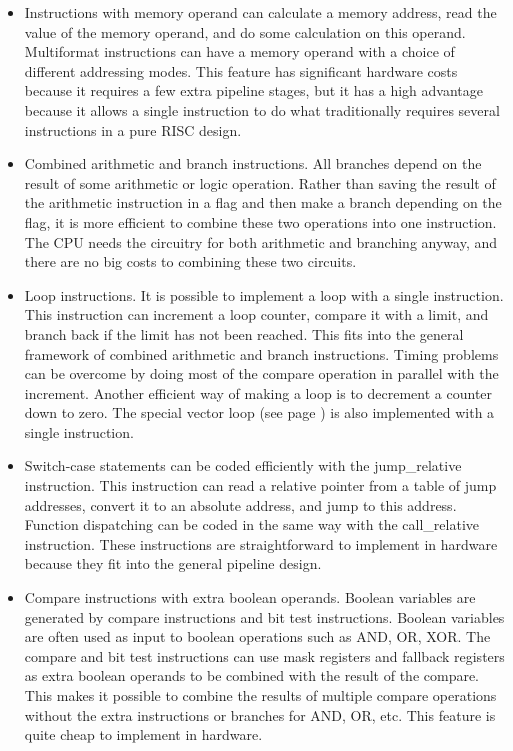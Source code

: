 \documentclass[forwardcom.tex]{subfiles}
\begin{document}
\begin{itemize}
\item Instructions with memory operand can calculate a memory address, read the value of the memory operand, and do some calculation on this operand. Multiformat instructions can have a memory operand with a choice of different addressing modes. This feature has significant hardware costs because it requires a few extra pipeline stages, but it has a high advantage because it allows a single instruction to do what traditionally requires several instructions in a pure RISC design.

\item Combined arithmetic and branch instructions. All branches depend on the result of some arithmetic or logic operation. Rather than saving the result of the arithmetic instruction in a flag and then make a branch depending on the flag, it is more efficient to combine these two operations into one instruction. The CPU needs the circuitry for both arithmetic and branching anyway, and there are no big costs to combining these two circuits.

\item Loop instructions. It is possible to implement a loop with a single instruction. This instruction can increment a loop counter, compare it with a limit, and branch back if the limit has not been reached. This fits into the general framework of combined arithmetic and branch instructions. Timing problems can be overcome by doing most of the compare operation in parallel with the increment. Another efficient way of making a loop is to decrement a counter down to zero. The special vector loop (see page \pageref{vectorLoops}) is also implemented with a single instruction.

\item Switch-case statements can be coded efficiently with the jump\_relative instruction. This instruction can read a relative pointer from a table of jump addresses, convert it to an absolute address, and jump to this address. Function dispatching can be coded in the same way with the call\_relative instruction. These instructions are straightforward to implement in hardware because they fit into the general pipeline design.

\item Compare instructions with extra boolean operands. Boolean variables are generated by compare instructions and bit test instructions. Boolean variables are often used as input to boolean operations such as AND, OR, XOR. The compare and bit test instructions can use mask registers and fallback registers as extra boolean operands to be combined with the result of the compare. This makes it possible to combine the results of multiple compare operations without the extra instructions or branches for AND, OR, etc. This feature is quite cheap to implement in hardware.


\end{itemize}
\end{document}
